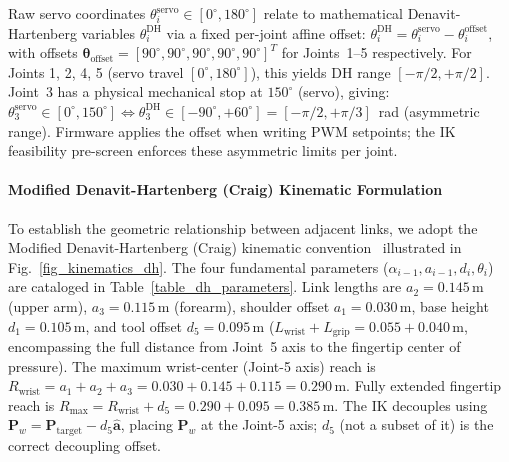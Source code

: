 \documentclass[journal]{IEEEtran}
\begin{document}
Raw servo coordinates $\theta_i^{\text{servo}} \in [0^\circ, 180^\circ]$ relate to mathematical Denavit-Hartenberg variables $\theta_i^{\text{DH}}$ via a fixed per-joint affine offset: $\theta_i^{\text{DH}} = \theta_i^{\text{servo}} - \theta_i^{\text{offset}}$, with offsets $\boldsymbol{\theta}_{\text{offset}} = [90^\circ, 90^\circ, 90^\circ, 90^\circ, 90^\circ]^T$ for Joints~1--5 respectively. For Joints 1, 2, 4, 5 (servo travel $[0^\circ, 180^\circ]$), this yields DH range $[-\pi/2, +\pi/2]$. Joint~3 has a physical mechanical stop at $150^\circ$ (servo), giving: $\theta_3^{\text{servo}} \in [0^\circ, 150^\circ] \Leftrightarrow \theta_3^{\text{DH}} \in [-90^\circ, +60^\circ] = [-\pi/2, +\pi/3]$~rad (asymmetric range). Firmware applies the offset when writing PWM setpoints; the IK feasibility pre-screen enforces these asymmetric limits per joint.

\paragraph{Modified Denavit-Hartenberg (Craig) Kinematic Formulation}
To establish the geometric relationship between adjacent links, we adopt the Modified Denavit-Hartenberg (Craig) kinematic convention~\cite{craig2005introduction,lynch2017modern,aria_040_wagaa_2023_analytical} illustrated in Fig.~\ref{fig_kinematics_dh}. The four fundamental parameters ($\alpha_{i-1}, a_{i-1}, d_i, \theta_i$) are cataloged in Table~\ref{table_dh_parameters}. Link lengths are $a_2 = 0.145$\,m (upper arm), $a_3 = 0.115$\,m (forearm), shoulder offset $a_1 = 0.030$\,m, base height $d_1 = 0.105$\,m, and tool offset $d_5 = 0.095$\,m ($L_{\text{wrist}} + L_{\text{grip}} = 0.055 + 0.040$\,m, encompassing the full distance from Joint~5 axis to the fingertip center of pressure). The maximum wrist-center (Joint-5 axis) reach is $R_{\text{wrist}} = a_1 + a_2 + a_3 = 0.030 + 0.145 + 0.115 = 0.290$\,m. Fully extended fingertip reach is $R_{\text{max}} = R_{\text{wrist}} + d_5 = 0.290 + 0.095 = 0.385$\,m. The IK decouples using $\mathbf{P}_w = \mathbf{P}_{\text{target}} - d_5 \hat{\mathbf{a}}$, placing $\mathbf{P}_w$ at the Joint-5 axis; $d_5$ (not a subset of it) is the correct decoupling offset.
\end{document}
